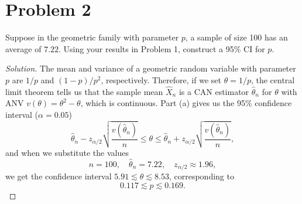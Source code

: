 \documentclass{article}
\begin{document}
\newpage
\section{Problem 2}

Suppose in the geometric family with parameter $p$, a sample of size 100 has an average of $7.22$. Using your results in Problem 1, construct a 95\% CI for $p$.

\begin{proof}[Solution]
The mean and variance of a geometric random variable with parameter $p$ are $1/p$ and $(1 - p)/p^2$, respectively. Therefore, if we set $\theta = 1/p$, the central limit theorem tells us that the sample mean $\hat{X}_n$ is a CAN estimator $\hat{\theta}_n$ for $\theta$ with ANV $v(\theta) = \theta^2 - \theta$, which is continuous. Part (a) gives us the 95\% confidence interval ($\alpha = 0.05$)
\begin{equation*}
\hat{\theta}_n - z_{\alpha/2}\sqrt{\frac{v(\hat{\theta}_n)}{n}}\leq\theta\leq\hat{\theta}_n + z_{\alpha/2}\sqrt{\frac{v(\hat{\theta}_n)}{n}},
\end{equation*}
and when we substitute the values
\begin{equation*}
n = 100,\quad\hat{\theta}_n = 7.22,\quad z_{\alpha/2}\approx 1.96,
\end{equation*}
we get the confidence interval $5.91\lesssim\theta\lesssim 8.53$, corresponding to
\begin{equation*}
0.117\lesssim p\lesssim 0.169.
\end{equation*}
\end{proof}
\end{document}

